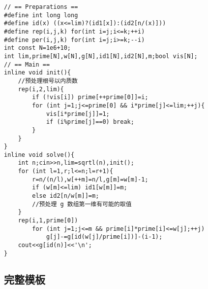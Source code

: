 \begin{verbatim}
// == Preparations ==
#define int long long
#define id(x) ((x<=lim)?(id1[x]):(id2[n/(x)]))
#define rep(i,j,k) for(int i=j;i<=k;++i)
#define per(i,j,k) for(int i=j;i>=k;--i)
int const N=1e6+10;
int lim,prime[N],w[N],g[N],id1[N],id2[N],m;bool vis[N];
// == Main ==
inline void init(){
    //预处理根号以内质数
    rep(i,2,lim){
        if (!vis[i]) prime[++prime[0]]=i;
        for (int j=1;j<=prime[0] && i*prime[j]<=lim;++j){
            vis[i*prime[j]]=1;
            if (i%prime[j]==0) break;
        }
    }
}
inline void solve(){
    int n;cin>>n,lim=sqrtl(n),init();
    for (int l=1,r;l<=n;l=r+1){
        r=n/(n/l),w[++m]=n/l,g[m]=w[m]-1;
        if (w[m]<=lim) id1[w[m]]=m;
        else id2[n/w[m]]=m;
        //预处理 g 数组第一维有可能的取值
    }
    rep(i,1,prime[0])
        for (int j=1;j<=m && prime[i]*prime[i]<=w[j];++j)
            g[j]-=g[id(w[j]/prime[i])]-(i-1);
    cout<<g[id(n)]<<'\n';
}
\end{verbatim}

\subsection{完整模板}

